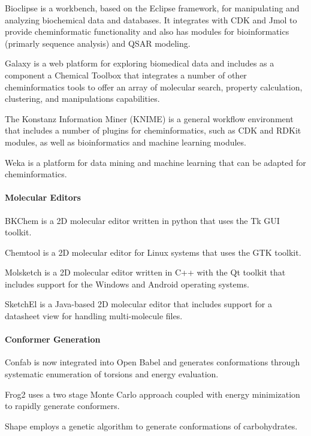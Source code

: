 Bioclipse  \cite{Spjuth_2009} is a workbench, based on the Eclipse framework, for manipulating and analyzing biochemical data and databases. It integrates with CDK and Jmol to provide cheminformatic functionality and also has modules for bioinformatics (primarly sequence analysis) and QSAR modeling.

Galaxy \cite{Goecks_2010} is a web platform for exploring biomedical data and includes as a component a Chemical Toolbox that integrates a number of other cheminformatics tools to offer an array of molecular search, property calculation, clustering, and manipulations capabilities.

The Konstanz Information Miner (KNIME) is a general workflow environment that includes a number of plugins for cheminformatics, such as CDK \cite{Beisken_2013} and RDKit modules, as well as bioinformatics and machine learning modules.

Weka \cite{Hall_2009} is a platform for data mining and machine learning that can be adapted for cheminformatics.  

\paragraph{Molecular Editors}

BKChem is a 2D molecular editor written in python that uses the Tk GUI toolkit.

Chemtool is a 2D molecular editor for Linux systems that uses the GTK toolkit.

Molsketch is a 2D molecular editor written in C++ with the Qt toolkit that includes support for the Windows and Android operating systems.

SketchEl is a Java-based 2D molecular editor that includes support for a datasheet view for handling multi-molecule files.

\paragraph{Conformer Generation}

Confab \cite{confab} is now integrated into Open Babel and generates conformations through systematic enumeration of torsions and energy evaluation.

Frog2 \cite{Miteva_2010} uses a two stage Monte Carlo approach coupled with energy minimization to rapidly generate conformers.

Shape \cite{Rosen_2009} employs a genetic algorithm to generate conformations of carbohydrates.

